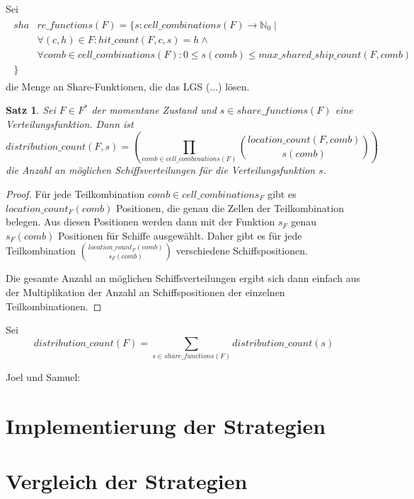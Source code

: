 \documentclass[a4paper,12pt]{llncs}
\newcommand{\N}{{\mathbb{N}}}
\numberwithin{equation}{section}
\newtheorem{satz}{Satz}
\begin{document}
\begin{definition}
Sei
\begin{align}
\begin{split}
sha&re\_functions(F)=\{s \colon cell\_combinations(F) \rightarrow \N_0 \mid\\
&\forall{(c,h) \in F}\colon hit\_count(F, c, s)=h \wedge \\
&\forall{comb \in cell\_combinations(F)} \colon 0 \leq s(comb) \leq max\_shared\_ship\_count(F, comb)\\
\}\;\;\;& \nonumber
\end{split}
\end{align}
die Menge an Share-Funktionen, die das LGS (...) lösen.
\end{definition}

\begin{satz}
Sei $F\in F^*$ der momentane Zustand und $s \in share\_functions(F)$ eine Verteilungsfunktion.
Dann ist
\[
distribution\_count(F, s)=
\left( \prod_{comb \in cell\_combinations(F)}{{location\_count(F, comb)\choose s(comb)}} \right)
\]
die Anzahl an möglichen Schiffsverteilungen für die Verteilungsfunktion $s$.
\end{satz}

\begin{proof}
Für jede Teilkombination $comb \in cell\_combinations_F$ gibt es $location\_count_F(comb)$ Positionen, die genau die Zellen der Teilkombination belegen. Aus diesen Positionen werden dann mit der Funktion $s_F$ genau $s_F(comb)$ Positionen für Schiffe ausgewählt. Daher gibt es für jede Teilkombination ${location\_count_F(comb)\choose s_F(comb)}$ verschiedene Schiffspositionen.

Die gesamte Anzahl an möglichen Schiffsverteilungen ergibt sich dann einfach aus der Multiplikation der Anzahl an Schiffspositionen der einzelnen Teilkombinationen.
\end{proof}

\begin{definition}
Sei
\[
distribution\_count(F)=\sum_{s \in share\_functions(F)}{distribution\_count(s)}
\]
\end{definition}

Joel und Samuel:

\section{Implementierung der Strategien}

\section{Vergleich der Strategien}


\newpage

 

\end{document}
